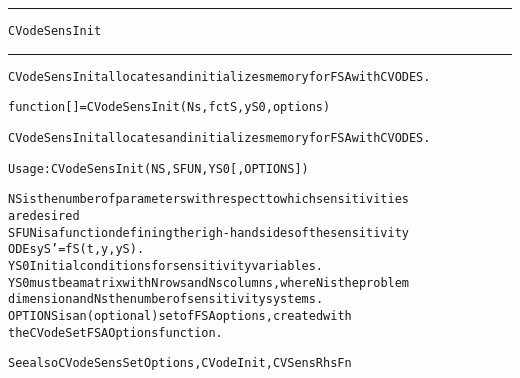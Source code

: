 \begin{samepage}
\hrule
\begin{center}
{\large \verb!CVodeSensInit!}
\label{p:CVodeSensInit}
\end{center}
\hrule\vspace{0.1in}



\begin{alltt}
CVodeSensInit allocates and initializes memory for FSA with CVODES.
\end{alltt}

\end{samepage}



\begin{samepage}


\begin{alltt}
function [] = CVodeSensInit(Ns,fctS,yS0,options) 
\end{alltt}

\end{samepage}



\begin{alltt}
CVodeSensInit allocates and initializes memory for FSA with CVODES.

   Usage: CVodeSensInit ( NS, SFUN, YS0 [, OPTIONS ] ) 

   NS       is the number of parameters with respect to which sensitivities
            are desired
   SFUN     is a function defining the righ-hand sides of the sensitivity
            ODEs yS' = fS(t,y,yS).
   YS0      Initial conditions for sensitivity variables.
            YS0 must be a matrix with N rows and Ns columns, where N is the problem
            dimension and Ns the number of sensitivity systems.
   OPTIONS  is an (optional) set of FSA options, created with
            the CVodeSetFSAOptions function. 

   See also CVodeSensSetOptions, CVodeInit, CVSensRhsFn
\end{alltt}






\vspace{0.1in}